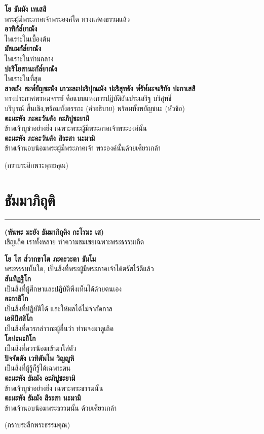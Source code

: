 \documentclass[12pt]{article}
\begin{document}
\textbf{โย ธัมมัง เทเสสิ\\}
\indent พระผู้มีพระภาคเจ้าพระองค์ใด ทรงแสดงธรรมแล้ว\\
\textbf{อาทิกัล๎ยาณัง\\}
\indent ไพเราะในเบื้องต้น\\
\textbf{มัชเฌกัล๎ยาณัง\\}
\indent ไพเราะในท่ามกลาง\\
\textbf{ปะริโยสานะกัล๎ยาณัง\\}
\indent ไพเราะในที่สุด\\
\textbf{สาตถัง สะพ๎ยัญชะนัง เกวะละปะริปุณณัง ปะริสุทธัง พ๎รัห๎มะจะริยัง ปะกาเสสิ\\}
\indent ทรงประกาศพรหมจรรย์ คือแบบแห่งการปฏิบัติอันประเสริฐ บริสุทธิ์\\
\indent บริบูรณ์ สิ้นเชิง,พร้อมทั้งอรรถะ (คำอธิบาย) พร้อมทั้งพยัญชนะ (หัวข้อ)\\
\textbf{ตะมะหัง ภะคะวันตัง อะภิปูชะยามิ\\}
\indent ข้าพเจ้าบูชาอย่างยิ่ง เฉพาะพระผู้มีพระภาคเจ้าพระองค์นั้น\\
\textbf{ตะมะหัง ภะคะวันตัง สิระสา นะมามิ\\}
\indent ข้าพเจ้านอบน้อมพระผู้มีพระภาคเจ้า พระองค์นั้นด้วยเศียรเกล้า\\
\begin{center}
(กราบระลึกพระพุทธคุณ)
\end{center}
\pagebreak
\section{ธัมมาภิถุติ}
\hrule
\begin{center}
\textbf{(หันทะ มะยัง ธัมมาภิถุติง กะโรมะ เส)\\}
เชิญเถิด เราทั้งหลาย ทำความชมเชยเฉพาะพระธรรมเถิด
\end{center}
\textbf{โย โส ส๎วากขาโต ภะคะวะตา ธัมโม\\}
\indent พระธรรมนั้นใด, เป็นสิ่งที่พระผู้มีพระภาคเจ้าได้ตรัสไว้ดีแล้ว\\
\textbf{สันทิฏฐิโก\\}
\indent เป็นสิ่งที่ผู้ศึกษาและปฏิบัติพึงเห็นได้ด้วยตนเอง\\
\textbf{อะกาลิโก\\}
\indent เป็นสิ่งที่ปฏิบัติได้ และให้ผลได้ไม่จำกัดกาล\\
\textbf{เอหิปัสสิโก\\}
\indent เป็นสิ่งที่ควรกล่าวกะผู้อื่นว่า ท่านจงมาดูเถิด\\
\textbf{โอปะนะยิโก\\}
\indent เป็นสิ่งที่ควรน้อมเข้ามาใส่ตัว\\
\textbf{ปัจจัตตัง เวทิตัพโพ วิญญูหิ\\}
\indent เป็นสิ่งที่ผู้รู้ก็รู้ได้เฉพาะตน\\
\textbf{ตะมะหัง ธัมมัง อะภิปูชะยามิ\\}
\indent ข้าพเจ้าบูชาอย่างยิ่ง เฉพาะพระธรรมนั้น\\
\textbf{ตะมะหัง ธัมมัง สิระสา นะมามิ\\}
\indent ข้าพเจ้านอบน้อมพระธรรมนั้น ด้วยเศียรเกล้า
\begin{center}
(กราบระลึกพระธรรมคุณ)
\end{center}
\pagebreak
\end{document}
